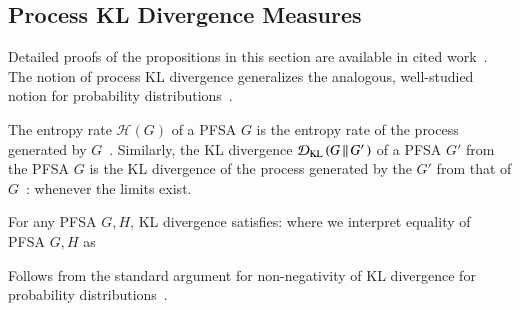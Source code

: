 \documentclass[9pt,journal]{IEEEtran}
\begin{document}
{   \subsection{Process KL Divergence Measures}
   Detailed proofs of the propositions in this section are available in  cited work~\cite{chattopadhyay2020deep}. The notion of process KL divergence generalizes the analogous, well-studied notion for probability distributions~\cite{cover2012elements}.
 \label{sec:ProcessKLDiv}
   \begin{defn}\label{defKL}
     The entropy rate $\mathcal{H}(G)$ of a PFSA $G$ is the entropy rate of the  process generated by $G$~\cite{cover2012elements}. Similarly, the KL divergence $\mathcal{D}_{\textrm{KL}}\left( G\,{\left\Vert\,G'\right.} \right)$ of a PFSA $G'$ from the PFSA $G$ is the KL divergence of the process generated by the $G'$ from that of $G$~\cite{vidyasagar2007bounds}:
     whenever the limits exist.
   \end{defn}
   \begin{lem}
     For any PFSA $G,H$, KL divergence satisfies:
     where we interpret equality of PFSA $G,H$ as
   \end{lem}
   \begin{IEEEproof}
 Follows from the standard argument for  non-negativity of KL divergence for probability distributions~\cite{cover2012elements}.
   \end{IEEEproof}
  
}
\end{document}
